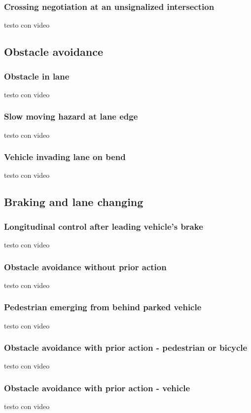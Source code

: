 \documentclass{article}
\begin{document}
\subsubsection{Crossing negotiation at an unsignalized intersection}
testo con video

\subsection{Obstacle avoidance}
\subsubsection{Obstacle in lane}
testo con video
\subsubsection{Slow moving hazard at lane edge}
testo con video 
\subsubsection{Vehicle invading lane on bend}
testo con video

\subsection{Braking and lane changing}
\subsubsection{Longitudinal control after leading vehicle’s brake}
testo con video
\subsubsection{Obstacle avoidance without prior action}
testo con video
\subsubsection{Pedestrian emerging from behind parked vehicle}
testo con video
\subsubsection{Obstacle avoidance with prior action - pedestrian or bicycle}
testo con video
\subsubsection{Obstacle avoidance with prior action - vehicle}
testo con video
\end{document}
